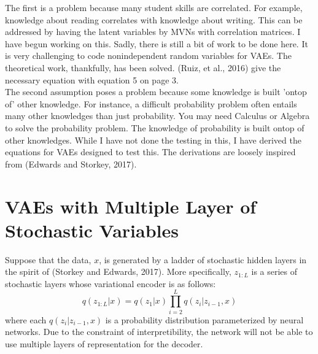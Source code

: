 \documentclass[10pt]{article}
\begin{document}
The first is a problem because many student skills are correlated.  For example, knowledge about reading correlates with knowledge about writing.  This can be addressed by having the latent variables by MVNs with correlation matrices.  I have begun working on this.  Sadly, there is still a bit of work to be done here.  It is very challenging to code nonindependent random variables for VAEs. The theoretical work, thankfully, has been solved.  (Ruiz, et al., 2016) give the necessary equation with equation 5 on page 3.    \\

The second assumption poses a problem because some knowledge is built 'ontop of' other knowledge.  For instance, a difficult probability problem often entails many other knowledges than just probability.  You may need Calculus or Algebra to solve the probability problem. The knowledge of probability is built ontop of other knowledges.  While I have not done the testing in this, I have derived the equations for VAEs designed to test this.  The derivations are loosely inspired from (Edwards and Storkey, 2017).


\section{VAEs with Multiple Layer of Stochastic Variables}
Suppose that the data, $x$, is generated by a ladder of stochastic hidden layers in the spirit of (Storkey and Edwards, 2017).  More specifically, $z_{1:L}$ is a series of stochastic layers whose variational encoder is as follows:
\begin{equation} \label{Encoder Network}
q(z_{1:L}|x) = q(z_{1}|x) \prod_{i=2}^{L}q(z_{i}|z_{i-1},x) 
\end{equation}
where each $q(z_{i}|z_{i-1},x)$ is a probability distribution parameterized by neural networks.  Due to the constraint of interpretibility, the network will not be able to use multiple layers of representation for the decoder.  
\end{document}
